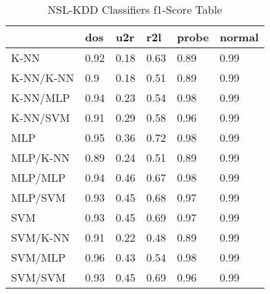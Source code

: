 \begin{table}[H]
\centering
\caption{NSL-KDD Classifiers f1-Score Table}
\label{nslf1scoretable}
\begin{tabular}{@{}llllll@{}}
\toprule
 & dos & u2r & r2l & probe & normal \\ \midrule
K-NN & 0.92 & 0.18 & 0.63 & 0.89 & 0.99 \\
K-NN/K-NN & 0.9 & 0.18 & 0.51 & 0.89 & 0.99 \\
K-NN/MLP & 0.94 & 0.23 & 0.54 & 0.98 & 0.99 \\
K-NN/SVM & 0.91 & 0.29 & 0.58 & 0.96 & 0.99 \\
MLP & 0.95 & 0.36 & 0.72 & 0.98 & 0.99 \\
MLP/K-NN & 0.89 & 0.24 & 0.51 & 0.89 & 0.99 \\
MLP/MLP & 0.94 & 0.46 & 0.67 & 0.98 & 0.99 \\
MLP/SVM & 0.93 & 0.45 & 0.68 & 0.97 & 0.99 \\
SVM & 0.93 & 0.45 & 0.69 & 0.97 & 0.99 \\
SVM/K-NN & 0.91 & 0.22 & 0.48 & 0.89 & 0.99 \\
SVM/MLP & 0.96 & 0.43 & 0.54 & 0.98 & 0.99 \\
SVM/SVM & 0.93 & 0.45 & 0.69 & 0.96 & 0.99 \\ \bottomrule
\end{tabular}
\end{table}
